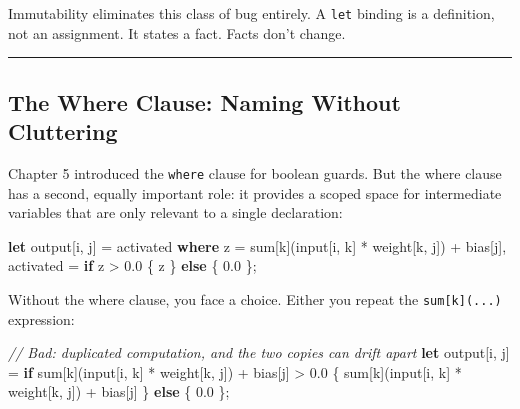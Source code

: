 \documentclass[11pt,]{article}
\newenvironment{Shaded}{}{}
\newcommand{\CommentTok}[1]{\textcolor[rgb]{0.38,0.63,0.69}{\textit{#1}}}
\newcommand{\DecValTok}[1]{\textcolor[rgb]{0.25,0.63,0.44}{#1}}
\newcommand{\KeywordTok}[1]{\textcolor[rgb]{0.00,0.44,0.13}{\textbf{#1}}}
\newcommand{\NormalTok}[1]{#1}
\newcommand{\OperatorTok}[1]{\textcolor[rgb]{0.40,0.40,0.40}{#1}}
\begin{document}
Immutability eliminates this class of bug entirely. A \texttt{let}
binding is a definition, not an assignment. It states a fact. Facts
don't change.

\begin{center}\rule{0.5\linewidth}{0.4pt}\end{center}

\hypertarget{the-where-clause-naming-without-cluttering}{%
\subsection{The Where Clause: Naming Without
Cluttering}\label{the-where-clause-naming-without-cluttering}}

Chapter 5 introduced the \texttt{where} clause for boolean guards. But
the where clause has a second, equally important role: it provides a
scoped space for intermediate variables that are only relevant to a
single declaration:

\begin{Shaded}
\begin{Highlighting}[]
\KeywordTok{let}\NormalTok{ output}\OperatorTok{[}\NormalTok{i, j}\OperatorTok{]}\NormalTok{ = activated}
    \KeywordTok{where}\NormalTok{ z = sum}\OperatorTok{[}\NormalTok{k}\OperatorTok{]}\NormalTok{(input}\OperatorTok{[}\NormalTok{i, k}\OperatorTok{]}\NormalTok{ * weight}\OperatorTok{[}\NormalTok{k, j}\OperatorTok{]}\NormalTok{) + bias}\OperatorTok{[}\NormalTok{j}\OperatorTok{]}\NormalTok{,}
\NormalTok{          activated = }\KeywordTok{if}\NormalTok{ z > }\DecValTok{0.0} \OperatorTok{\{}\NormalTok{ z }\OperatorTok{\}} \KeywordTok{else} \OperatorTok{\{} \DecValTok{0.0} \OperatorTok{\}}\NormalTok{;}
\end{Highlighting}
\end{Shaded}

Without the where clause, you face a choice. Either you repeat the
\texttt{sum{[}k{]}(...)} expression:

\begin{Shaded}
\begin{Highlighting}[]
\CommentTok{// Bad: duplicated computation, and the two copies can drift apart}
\KeywordTok{let}\NormalTok{ output}\OperatorTok{[}\NormalTok{i, j}\OperatorTok{]}\NormalTok{ = }\KeywordTok{if}\NormalTok{ sum}\OperatorTok{[}\NormalTok{k}\OperatorTok{]}\NormalTok{(input}\OperatorTok{[}\NormalTok{i, k}\OperatorTok{]}\NormalTok{ * weight}\OperatorTok{[}\NormalTok{k, j}\OperatorTok{]}\NormalTok{) + bias}\OperatorTok{[}\NormalTok{j}\OperatorTok{]}\NormalTok{ > }\DecValTok{0.0}
    \OperatorTok{\{}\NormalTok{ sum}\OperatorTok{[}\NormalTok{k}\OperatorTok{]}\NormalTok{(input}\OperatorTok{[}\NormalTok{i, k}\OperatorTok{]}\NormalTok{ * weight}\OperatorTok{[}\NormalTok{k, j}\OperatorTok{]}\NormalTok{) + bias}\OperatorTok{[}\NormalTok{j}\OperatorTok{]} \OperatorTok{\}}
    \KeywordTok{else} \OperatorTok{\{} \DecValTok{0.0} \OperatorTok{\}}\NormalTok{;}
\end{Highlighting}
\end{Shaded}
\end{document}
